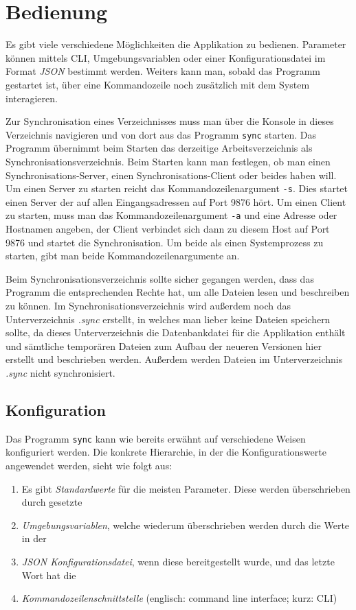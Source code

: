 \section{Bedienung}
\label{cha:Bedienung}

Es gibt viele verschiedene Möglichkeiten die Applikation zu bedienen. Parameter können mittels CLI, Umgebungsvariablen oder einer Konfigurationsdatei im
Format \textsl{JSON} bestimmt werden. Weiters kann man, sobald das Programm gestartet ist, über eine Kommandozeile noch zusätzlich mit dem System interagieren.

Zur Synchronisation eines Verzeichnisses muss man über die Konsole in dieses Verzeichnis navigieren und von dort aus das Programm \verb|sync| starten. 
Das Programm übernimmt beim Starten das derzeitige Arbeitsverzeichnis als Synchronisationsverzeichnis. Beim Starten kann man festlegen, ob man einen 
Synchronisations-Server, einen Synchronisations-Client oder beides haben will. Um einen Server zu starten reicht das Kommandozeilenargument \verb|-s|.
Dies startet einen Server der auf allen Eingangsadressen auf Port 9876 hört. Um einen Client zu starten, muss man das Kommandozeilenargument \verb|-a| 
und eine Adresse oder Hostnamen angeben, der Client verbindet sich dann zu diesem Host auf Port 9876 und startet die Synchronisation. 
Um beide als einen Systemprozess zu starten, gibt man beide Kommandozeilenargumente an.

Beim Synchronisationsverzeichnis sollte sicher gegangen werden, dass das Programm die entsprechenden Rechte hat, um alle Dateien lesen und beschreiben zu können.
Im Synchronisationsverzeichnis wird außerdem noch das Unterverzeichnis \textit{.sync} erstellt, in welches man lieber keine Dateien speichern sollte, da dieses 
Unterverzeichnis die Datenbankdatei für die Applikation enthält und sämtliche temporären Dateien zum Aufbau der neueren Versionen hier erstellt und beschrieben 
werden. Außerdem werden Dateien im Unterverzeichnis \textit{.sync} nicht synchronisiert.

\subsection{Konfiguration}
\label{sec:konfiguration}

Das Programm \verb|sync| kann wie bereits erwähnt auf verschiedene Weisen konfiguriert werden.
Die konkrete Hierarchie, in der die Konfigurationswerte angewendet werden, sieht wie folgt aus:
\begin{enumerate}
\item Es gibt \emph{Standardwerte} für die meisten Parameter. Diese werden überschrieben durch gesetzte
\item \emph{Umgebungsvariablen}, welche wiederum überschrieben werden durch die Werte in der
\item \emph{JSON Konfigurationsdatei}, wenn diese bereitgestellt wurde, und das letzte Wort hat die
\item \emph{Kommandozeilenschnittstelle} (englisch: command line interface; kurz: CLI)
\end{enumerate}

